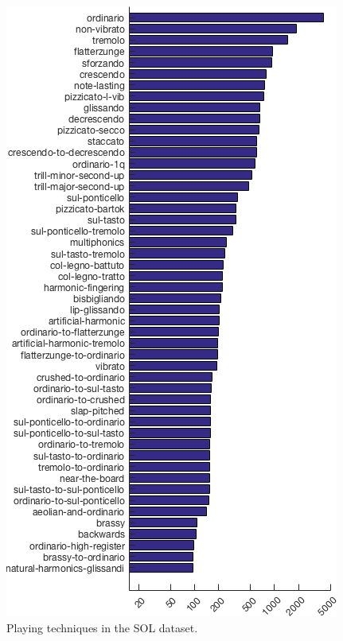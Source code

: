 \documentclass{article}
\begin{document}
\begin{figure}[h!]
\centering
\includegraphics[width=\linewidth]{./figs/histogram/histogram_modes.png}
\caption{Playing techniques in the SOL dataset.}
\label{fig:technique-histogram}
\end{figure}


\end{document}

